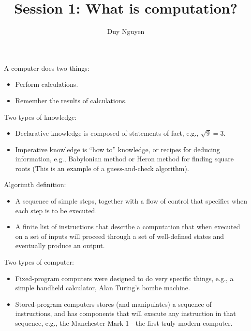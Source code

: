 \documentclass[10pt,a5paper]{article}
\author{Duy Nguyen}
\title{Session 1: What is computation?}
\begin{document}
\maketitle

A computer does two things:
\begin{itemize} 

	\item Perform calculations.
	
	\item Remember the results of calculations.
	
\end{itemize}

Two types of knowledge:
\begin{itemize} 

	\item Declarative knowledge is composed of statements of fact, e.g., $\sqrt{9} = 3$.
	
	\item Imperative knowledge is “how to” knowledge, or recipes for deducing information, e.g., Babylonian method or Heron method for finding square roots (This is an example of a guess-and-check algorithm).
	
\end{itemize}

Algorimth definition:
\begin{itemize} 

	\item A sequence of simple steps, together with a flow of control that specifies when each step is to be executed.
	
	\item A finite list of instructions that describe a computation that when executed on a set of inputs will proceed through a set of well-defined states and eventually produce an output.
	
\end{itemize}

Two types of computer: 
\begin{itemize}

	\item Fixed-program computers were designed to do very specific things, e.g., a simple handheld calculator, Alan Turing’s bombe machine.
	
	\item Stored-program computers stores (and manipulates) a sequence of instructions, and has components that will execute any instruction in that sequence, e.g., the Manchester Mark 1 - the first truly modern computer.
	
\end{itemize}
\end{document}

